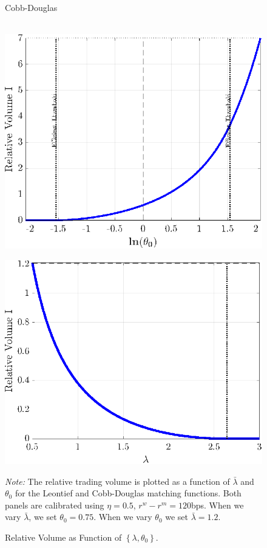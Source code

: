 \documentclass[12pt,american,english,notitlepage]{article}
\begin{document}
\begin{figure}[H]
\centerline{Cobb-Douglas }
  \begin{minipage}[b]{.49\linewidth} 
  \\[4pt]
\includegraphics[width=0.8\linewidth]{NewCode/Figures/F_cd_Vol_theta.eps}
\end{minipage}
\begin{minipage}[b]{.49\linewidth}
\includegraphics[width=0.8\linewidth]{NewCode/Figures/F_cd_Vol_lambda.eps}
\end{minipage}

\caption{\label{fig:volume.compstats} Relative Volume as Function
of $\left\{ \lambda,\theta_{0}\right\} $.} 

\parbox[b]{0.99 \textwidth} {\footnotesize \emph{Note:} The relative trading
volume is plotted as a function of $\bar{\lambda}$ and $\theta_{0}$
for the Leontief and Cobb-Douglas matching functions. Both panels
are calibrated using $\eta=0.5$, $r^{w}-r^{m}=120$bps. When we vary
$\bar{\lambda}$, we set $\theta_{0}=0.75$. When we vary $\theta_{0}$
we set $\bar{\lambda}=1.2$.}
\end{figure}
\end{document}
